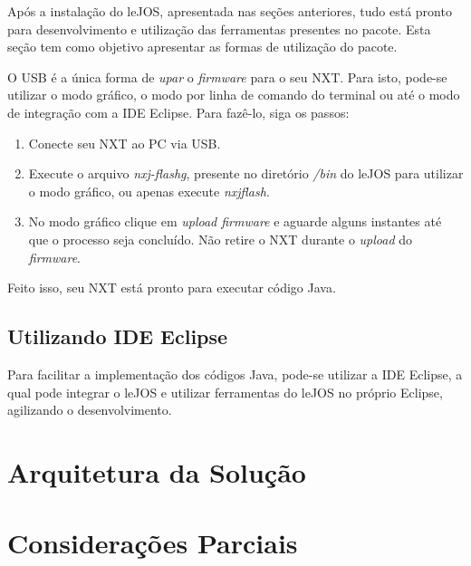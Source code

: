 	Após a instalação do leJOS, apresentada nas seções anteriores, tudo está pronto para desenvolvimento e utilização das ferramentas presentes no pacote. Esta seção tem como objetivo apresentar as formas de utilização do pacote.

	O USB é a única forma de \textit{upar} o \textit{firmware} para o seu NXT. Para isto, pode-se utilizar o modo gráfico, o modo por linha de comando do terminal ou até o modo de integração com a IDE Eclipse. Para fazê-lo, siga os passos:

	\begin{enumerate}
		\item Conecte seu NXT ao PC via USB.
		\item Execute o arquivo \textit{nxj-flashg}, presente no diretório \textit{/bin} do leJOS para utilizar o modo gráfico, ou apenas execute \textit{nxjflash}.
		\item No modo gráfico clique em \textit{upload firmware} e aguarde alguns instantes até que o processo seja concluído. Não retire o NXT durante o \textit{upload} do \textit{firmware}.
	\end{enumerate}

	Feito isso, seu NXT está pronto para executar código Java.

\subsection{Utilizando IDE Eclipse} %
\label{sub:utilizando_ide_eclipse}

	Para facilitar a implementação dos códigos Java, pode-se utilizar a IDE Eclipse, a qual pode integrar o leJOS e utilizar ferramentas do leJOS no próprio Eclipse, agilizando o desenvolvimento.

\section{Arquitetura da Solução}

\section{Considerações Parciais}